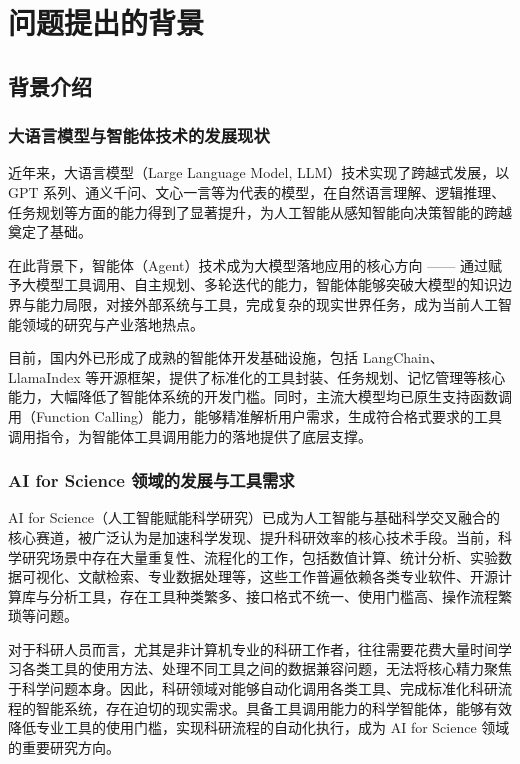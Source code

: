 \section{问题提出的背景}

\subsection{背景介绍}

\subsubsection{大语言模型与智能体技术的发展现状}

近年来，大语言模型（Large Language Model, LLM）技术实现了跨越式发展\cite{brown2020gpt3,openai2023gpt4}，以 GPT 系列、通义千问、文心一言等为代表的模型，在自然语言理解、逻辑推理、任务规划等方面的能力得到了显著提升，为人工智能从感知智能向决策智能的跨越奠定了基础\cite{brown2020gpt3}。

在此背景下，智能体（Agent）技术成为大模型落地应用的核心方向 —— 通过赋予大模型工具调用、自主规划、多轮迭代的能力，智能体能够突破大模型的知识边界与能力局限，对接外部系统与工具，完成复杂的现实世界任务，成为当前人工智能领域的研究与产业落地热点\cite{yao2023react,schick2023toolformer,qin2023toollearning}。

目前，国内外已形成了成熟的智能体开发基础设施，包括 LangChain、LlamaIndex 等开源框架\cite{langchain2023,llamaindex2023}，提供了标准化的工具封装、任务规划、记忆管理等核心能力，大幅降低了智能体系统的开发门槛。同时，主流大模型均已原生支持函数调用（Function Calling）能力\cite{openai2023gpt4}，能够精准解析用户需求，生成符合格式要求的工具调用指令，为智能体工具调用能力的落地提供了底层支撑\cite{schick2023toolformer,qin2023toollearning}。

\subsubsection{AI for Science 领域的发展与工具需求}

AI for Science（人工智能赋能科学研究）已成为人工智能与基础科学交叉融合的核心赛道，被广泛认为是加速科学发现、提升科研效率的核心技术手段\cite{jumper2021alphafold,butler2018ml4mat}。当前，科学研究场景中存在大量重复性、流程化的工作，包括数值计算、统计分析、实验数据可视化、文献检索、专业数据处理等，这些工作普遍依赖各类专业软件、开源计算库与分析工具，存在工具种类繁多、接口格式不统一、使用门槛高、操作流程繁琐等问题。

对于科研人员而言，尤其是非计算机专业的科研工作者，往往需要花费大量时间学习各类工具的使用方法、处理不同工具之间的数据兼容问题，无法将核心精力聚焦于科学问题本身。因此，科研领域对能够自动化调用各类工具、完成标准化科研流程的智能系统，存在迫切的现实需求。具备工具调用能力的科学智能体，能够有效降低专业工具的使用门槛，实现科研流程的自动化执行，成为 AI for Science 领域的重要研究方向\cite{shen2023hugginggpt,jumper2021alphafold}。

